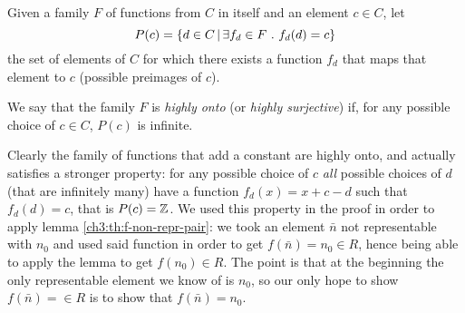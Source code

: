 \begin{definition}\label{ch4:def:highly-onto-func-family}
	Given a family $F$ of functions from $C$ in itself and an element $c \in C$, let
	\[
	P(c) = \{ d \in C \,\vert\, \exists f_d \in F\ .\ f_d(d) = c \}
	\]
	the set of elements of $C$ for which there exists a function $f_d$ that maps that element to $c$ (possible preimages of $c$).

	We say that the family $F$ is \textit{highly onto} (or \textit{highly surjective}) if, for any possible choice of $c \in C$, $P(c)$ is infinite.
\end{definition}

Clearly the family of functions that add a constant are highly onto, and actually satisfies a stronger property: for any possible choice of $c$ \textit{all} possible choices of $d$ (that are infinitely many) have a function $f_d(x) = x + c - d$ such that $f_d(d) = c$, that is $P(c) = \mathbb{Z}$. We used this property in the proof in order to apply lemma \ref{ch3:th:f-non-repr-pair}: we took an element $\bar{n}$ not representable with $n_0$ and used said function in order to get $f(\bar{n}) = n_0 \in R$, hence being able to apply the lemma to get $f(n_0) \in R$. The point is that at the beginning the only representable element we know of is $n_0$, so our only hope to show $f(\bar{n}) = \in R$ is to show that $f(\bar{n}) = n_0$.


